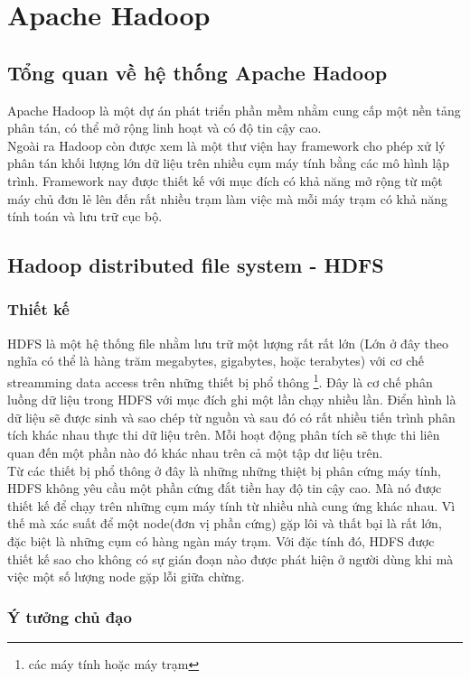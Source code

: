 \chapter{Apache Hadoop}
\section{Tổng quan về hệ thống Apache Hadoop}
Apache Hadoop là một dự án phát triển phần mềm nhằm cung cấp một nền tảng phân tán, có thể mở rộng linh hoạt và có độ tin cậy cao.\\
Ngoài ra Hadoop còn được xem là một thư viện hay framework cho phép xử lý phân tán khối lượng lớn dữ liệu trên nhiều cụm máy tính bằng các mô hình lập trình. Framework nay được thiết kế với mục đích có khả năng mở rộng từ một máy chủ đơn lẻ lên đến rất nhiều trạm làm việc mà mỗi máy trạm có khả năng tính toán và lưu trữ cục bộ.
\section{Hadoop distributed file system - HDFS}
\subsection{Thiết kế}
HDFS là một hệ thống file nhằm lưu trữ một lượng rất rất lớn (Lớn ở đây theo nghĩa có thể là hàng trăm megabytes, gigabytes, hoặc terabytes) với cơ chế streamming data access trên những thiết bị phổ thông \footnote{các máy tính hoặc máy trạm}.
 Đây là cơ chế phân luồng dữ liệu trong HDFS với mục đích ghi một lần chạy nhiều lần. Điển hình là dữ liệu sẽ được sinh và sao chép từ nguồn và sau đó có rất nhiều tiến trình phân tích khác nhau thực thi dữ liệu trên. Mỗi hoạt động phân tích sẽ thực thi liên quan đến một phần nào đó khác nhau trên cả một tập dư liệu trên.\\
 Từ các thiết bị phổ thông ở đây là những những thiệt bị phân cứng máy tính, HDFS không yêu cầu một phần cứng đắt tiền hay độ tin cậy cao. Mà nó được thiết kế để chạy trên những cụm máy tính từ nhiều nhà cung ứng khác nhau. Vì thế mà xác suất để một node(đơn vị phần cứng) gặp lôi và thất bại là rất lớn, đặc biệt là những cụm có hàng ngàn máy trạm. Với đặc tính đó, HDFS được thiết kế sao cho không có sự gián đoạn nào được phát hiện ở người dùng khi mà việc một số lượng node gặp lỗi giữa chừng.
\subsection{Ý tưởng chủ đạo}
